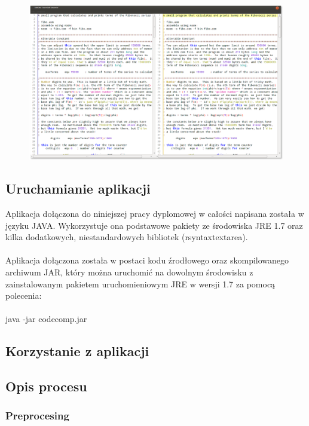 \documentclass[a4paper,12pt]{article}
\begin{document}
\begin{figure}[!h]
\centering
\includegraphics[scale=0.33]{gfx/main_window.png}
\end{figure}

\newpage

\subsection{Uruchamianie aplikacji}

Aplikacja dołączona do niniejszej pracy dyplomowej w całości napisana została w języku JAVA. Wykorzystuje ona podstawowe pakiety ze środowiska JRE 1.7 oraz kilka dodatkowych, niestandardowych bibliotek (rsyntaxtextarea).
\\ \\
Aplikacja dołączona została w postaci kodu źrodłowego oraz skompilowanego archiwum JAR, który można uruchomić na dowolnym środowisku z zainstalowanym pakietem uruchomieniowym JRE w wersji 1.7 za pomocą polecenia:
\\ \\
java -jar codecomp.jar

\subsection{Korzystanie z aplikacji}

\newpage

\subsection{Opis procesu}

\subsubsection{Preprocesing}
\end{document}
